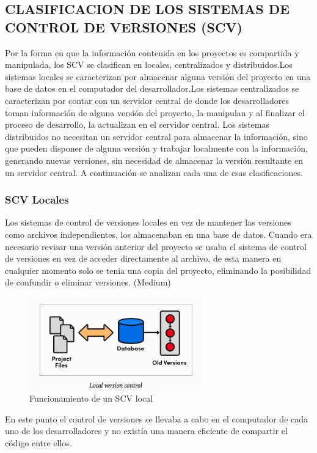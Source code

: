 \documentclass[a4paper,12pt]{article}
\begin{document}
{\subsection{CLASIFICACION DE LOS SISTEMAS DE CONTROL DE VERSIONES (SCV)}
Por la forma en que la información contenida en los proyectos es compartida y manipulada, los SCV se clasifican en locales, centralizados y distribuidos.Los sistemas locales se caracterizan por almacenar alguna versión del proyecto en una base de datos en el computador del desarrollador.Los sistemas centralizados se caracterizan por contar con un servidor central de donde los desarrolladores toman información de alguna versión del proyecto, la manipulan y al finalizar el proceso de desarrollo, la actualizan en el servidor central. Los sistemas distribuidos no necesitan un servidor central para almacenar la información, sino que pueden disponer de alguna versión y trabajar localmente con la
información, generando nuevas versiones, sin necesidad de almacenar la versión resultante en un
servidor central. A continuación se analizan cada una de esas clasificaciones.

\subsubsection{SCV Locales}
Los sistemas de control de versiones locales en vez de mantener las versiones como archivos independientes, los almacenaban en una base de datos. Cuando era necesario revisar una versión anterior del proyecto se usaba el sistema de control de versiones en vez de acceder directamente al archivo, de esta manera en cualquier momento solo se tenia una copia del proyecto, eliminando la posibilidad de confundir o eliminar versiones. (Medium)

\begin{figure}[h]
	\centering
	\begin{minipage}[t]{5.5cm}
		\includegraphics[width=7.5cm]{grafico5.png}	 %
		\caption{ Funcionamiento de un SCV local}
	\end{minipage}
\end{figure}
En este punto el control de versiones se llevaba a cabo en el computador de cada uno de los desarrolladores y no existía una manera eficiente de compartir el código entre ellos.

}
\end{document}

